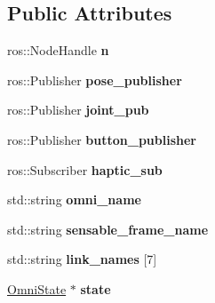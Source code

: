 \subsection*{Public Attributes}
\begin{DoxyCompactItemize}
\item 
\hypertarget{class_phantom_r_o_s_ad5ae1b044eca8c7dcda7576bf17e554e}{ros\-::\-Node\-Handle {\bfseries n}}\label{class_phantom_r_o_s_ad5ae1b044eca8c7dcda7576bf17e554e}

\item 
\hypertarget{class_phantom_r_o_s_a8e9f3f18ce52aeac59f6758c38ca824d}{ros\-::\-Publisher {\bfseries pose\-\_\-publisher}}\label{class_phantom_r_o_s_a8e9f3f18ce52aeac59f6758c38ca824d}

\item 
\hypertarget{class_phantom_r_o_s_a270ba243038bca76b426602d59265354}{ros\-::\-Publisher {\bfseries joint\-\_\-pub}}\label{class_phantom_r_o_s_a270ba243038bca76b426602d59265354}

\item 
\hypertarget{class_phantom_r_o_s_aa766b00fc138543539ebbcdf1912727b}{ros\-::\-Publisher {\bfseries button\-\_\-publisher}}\label{class_phantom_r_o_s_aa766b00fc138543539ebbcdf1912727b}

\item 
\hypertarget{class_phantom_r_o_s_afd2946a49b1c1c04af1db7e2aec54b52}{ros\-::\-Subscriber {\bfseries haptic\-\_\-sub}}\label{class_phantom_r_o_s_afd2946a49b1c1c04af1db7e2aec54b52}

\item 
\hypertarget{class_phantom_r_o_s_a30c310835c356a897764aa9169dd045e}{std\-::string {\bfseries omni\-\_\-name}}\label{class_phantom_r_o_s_a30c310835c356a897764aa9169dd045e}

\item 
\hypertarget{class_phantom_r_o_s_ab06b5bda71bf262bcfd894f2518f4536}{std\-::string {\bfseries sensable\-\_\-frame\-\_\-name}}\label{class_phantom_r_o_s_ab06b5bda71bf262bcfd894f2518f4536}

\item 
\hypertarget{class_phantom_r_o_s_a867fa6d2f356ad77d374c27850e4a67d}{std\-::string {\bfseries link\-\_\-names} \mbox{[}7\mbox{]}}\label{class_phantom_r_o_s_a867fa6d2f356ad77d374c27850e4a67d}

\item 
\hypertarget{class_phantom_r_o_s_af3451d041bc102c7fbdeac8605251957}{\hyperlink{struct_omni_state}{Omni\-State} $\ast$ {\bfseries state}}\label{class_phantom_r_o_s_af3451d041bc102c7fbdeac8605251957}


\end{DoxyCompactItemize}
